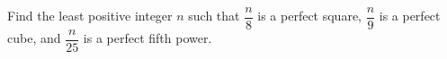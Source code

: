 Find the least positive integer $n$ such that $\dfrac{n}{8}$ is a perfect square, $\dfrac{n}{9}$ is a perfect cube, and $\dfrac{n}{25}$ is a perfect fifth power.
